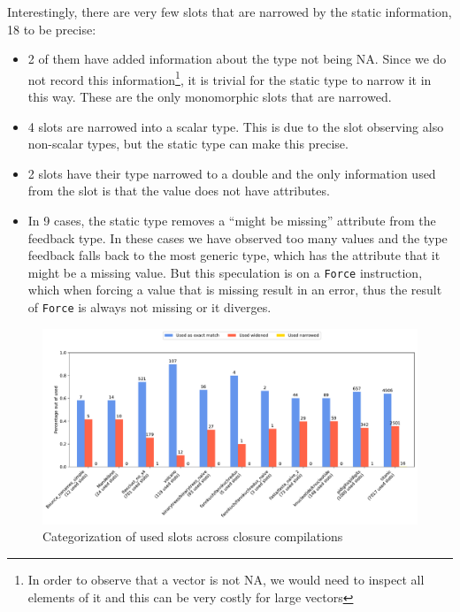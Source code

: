 Interestingly, there are very few slots that are narrowed by the static information, 18 to be precise:

\begin{itemize}
	\item{} 2 of them have added information about the type not being NA. Since we do not record this information\footnote{In order to observe that a vector is not NA, we would need to inspect all elements of it and this can be very costly for large vectors}, it is trivial for the static type to narrow it in this way. These are the only monomorphic slots that are narrowed.
	\item{} 4 slots are narrowed into a scalar type. This is due to the slot observing also non-scalar types, but the static type can make this precise.
	\item{} 2 slots have their type narrowed to a double and the only information used from the slot is that the value does not have attributes.
	\item{} In 9 cases, the static type removes a \enquote{might be missing} attribute from the feedback type. In these cases we have observed too many values and the type feedback falls back to the most generic type, which has the attribute that it might be a missing value. But this speculation is on a \texttt{Force} instruction, which when forcing a value that is missing result in an error, thus the result of \texttt{Force} is always not missing or it diverges.
\end{itemize}


\begin{figure}
	\centering
	\begin{adjustwidth}{-3cm}{-3cm}
		\includegraphics[width=1.5\textwidth]{figures/used.pdf}
	\end{adjustwidth}
	\caption{Categorization of used slots across closure compilations}\label{fig:graph-used}
\end{figure}

